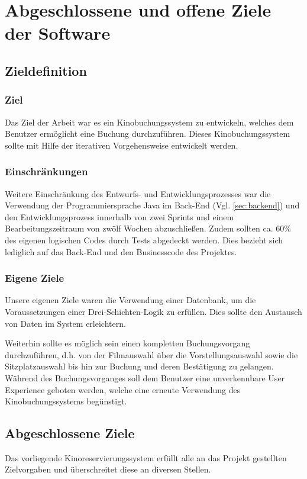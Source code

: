 \section{Abgeschlossene und offene Ziele der Software}
\multipleauthorsection{\authorRF}{\authorEJ}
\label{sec:ziele}
\subsection{Zieldefinition}
\subsubsection*{Ziel}
Das Ziel der Arbeit war es ein Kinobuchungssystem zu entwickeln, welches dem Benutzer ermöglicht eine Buchung durchzuführen.
Dieses Kinobuchungssystem sollte mit Hilfe der iterativen Vorgehensweise entwickelt werden.
\subsubsection*{Einschränkungen}
Weitere Einschränkung des Entwurfs- und Entwicklungsprozesses war die Verwendung der Programmiersprache Java im Back-End (Vgl. \vref{sec:backend}) und den Entwicklungsprozess innerhalb von zwei Sprints und einem Bearbeitungszeitraum von zwölf Wochen abzuschließen.
Zudem sollten ca. 60\% des eigenen logischen Codes durch Tests abgedeckt werden. Dies bezieht sich lediglich auf das Back-End und den Businesscode des Projektes.

\subsubsection*{Eigene Ziele}
Unsere eigenen Ziele waren die Verwendung einer Datenbank, um die Voraussetzungen einer Drei-Schichten-Logik zu erfüllen.
Dies sollte den Austausch von Daten im System erleichtern.

Weiterhin sollte es möglich sein einen kompletten Buchungsvorgang durchzuführen, d.h. von der Filmauswahl über die Vorstellungsauswahl sowie die Sitzplatzauswahl bis hin zur Buchung und deren Bestätigung zu gelangen.
Während des Buchungsvorganges soll dem Benutzer eine unverkennbare User Experience geboten werden, welche eine erneute Verwendung des Kinobuchungssystems begünstigt.

\subsection{Abgeschlossene Ziele}
\label{ssec:abgeschlossene_ziele}
Das vorliegende Kinoreservierungssystem erfüllt alle an das Projekt gestellten Zielvorgaben und überschreitet diese an diversen Stellen. 

